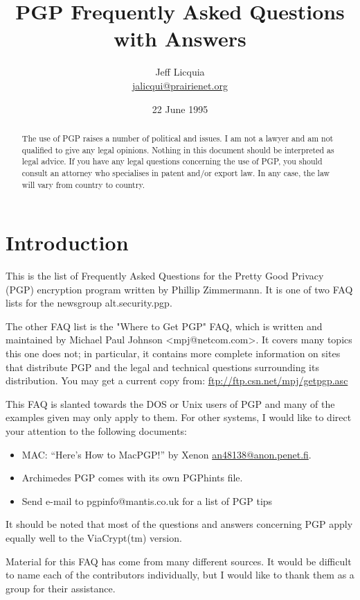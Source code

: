\documentclass[12pt]{article}
\title{PGP Frequently Asked Questions with Answers}
\author{Jeff Licquia\\\href{mailto:jalicqui@prairienet.org}{jalicqui@prairienet.org}}
\date{22 June 1995}
\begin{document}
\maketitle

\begin{abstract}
The use of PGP raises a number of political and issues. I am not a lawyer and am not qualified to give any legal opinions. Nothing in this document should be interpreted as legal advice. If you have any legal questions concerning the use of PGP, you should consult an attorney who specialises in patent and/or export law. In any case, the law will vary from country to country.
\end{abstract}

\tableofcontents

\section{Introduction}
This is the list of Frequently Asked Questions for the Pretty Good Privacy (PGP) encryption program written by Phillip Zimmermann. It is one of two FAQ lists for the newsgroup alt.security.pgp.

The other FAQ list is the "Where to Get PGP" FAQ, which is written and maintained by Michael Paul Johnson <mpj@netcom.com>. It covers many topics this one does not; in particular, it contains more complete information on sites that distribute PGP and the legal and technical questions surrounding its distribution. You may get a current copy from: \url{ftp://ftp.csn.net/mpj/getpgp.asc}

This FAQ is slanted towards the DOS or Unix users of PGP and many of the examples given may only apply to them. For other systems, I would like to direct your attention to the following documents:
\begin{itemize}
\item MAC: ``Here's How to MacPGP!'' by Xenon \href{mailto:an48138@anon.penet.fi}{an48138@anon.penet.fi}.
\item Archimedes PGP comes with its own PGPhints file.
\item Send e-mail to pgpinfo@mantis.co.uk for a list of PGP tips
\end{itemize}

It should be noted that most of the questions and answers concerning PGP apply equally well to the ViaCrypt(tm) version.

Material for this FAQ has come from many different sources. It would be difficult to name each of the contributors individually, but I would like to thank them as a group for their assistance.
\end{document}
